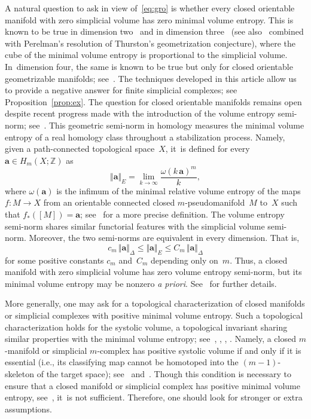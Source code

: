 \documentclass[11pt]{article}
\newcommand{\ie}{i.e.,\xspace}
\newcommand{\bma}{{\boldsymbol{a}}}
\theoremstyle{definition}
\newcommand\Z{{\mathbb Z}}
\numberwithin{equation}{section}
\begin{document}
A natural question to ask in view of~\eqref{eq:gro} is whether every closed orientable manifold with zero simplicial volume has zero minimal volume entropy.
This is known to be true in dimension two~\cite{katok} and in dimension three~\cite{pieroni} (see also~\cite{AP03} combined with Perelman's resolution of Thurston's geometrization conjecture), where the cube of the minimal volume entropy is proportional to the simplicial volume. In~dimension four, the same is known to be true but only for closed orientable geometrizable manifolds; see~\cite{SS09}.
The techniques developed in this article allow us to provide a negative answer for finite simplicial complexes; see Proposition~\ref{prop:ex}.
The question for closed orientable manifolds remains open despite recent progress made with the introduction of the volume entropy semi-norm; see~\cite{BS}.
This geometric semi-norm in homology measures the minimal volume entropy of a real homology class throughout a stabilization process.
Namely, given a path-connected topological space~$X$, it~is defined for every $\bma \in H_m(X;\Z)$ as
\begin{equation*}%
\Vert \bma \Vert_E = \lim_{k \to \infty} \frac{\omega(k \, \bma)^m}{k},
\end{equation*}
where $\omega(\bma)$ is the infimum of the minimal relative volume entropy of the maps \hbox{$f:M \to X$} from an orientable connected closed $m$\nobreakdash-pseudomanifold~$M$ to~$X$ such that $f_*([M])=\bma$; see~\cite{BS} for a more precise definition.
The volume entropy semi-norm shares similar functorial features with the simplicial volume semi-norm.
Moreover, the two semi-norms are equivalent in every dimension.
That is,
\begin{equation} \label{eq:BS}
c_m \, \Vert \bma \Vert_\Delta \leq \Vert \bma \Vert_E \leq C_m \, \Vert \bma \Vert_\Delta
\end{equation}
for some positive constants $c_m$ and~$C_m$ depending only on~$m$.
Thus, a closed manifold with zero simplicial volume has zero volume entropy semi-norm, but its minimal volume entropy may be nonzero \emph{a priori}.
See~\cite{BS} for further details.

More generally, one may ask for a topological characterization of closed manifolds or simplicial complexes with positive minimal volume entropy.
Such a topological characterization holds for the systolic volume, a topological invariant sharing similar properties with the minimal volume entropy; see~\cite{B93}, \cite{B06}, \cite{B08}, \cite{Brunnbauer08}.
Namely, a closed $m$\nobreakdash-manifold or simplicial $m$\nobreakdash-complex has positive systolic volume if and only if it is essential (\ie its classifying map cannot be homotoped into the $(m-1)$-skeleton of the target space); see~\cite{gro83} and~\cite{B93}.
Though this condition is necessary to ensure that a closed manifold or simplicial complex has positive minimal volume entropy, see~\cite{B93}, it~is not sufficient.
Therefore, one should look for stronger or extra assumptions.
\end{document}
